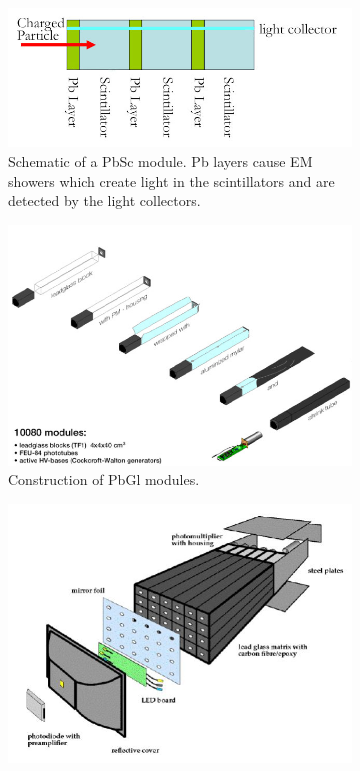 \begin{figure}
\centering
\begin{subfigure}[p]{0.5\textwidth}
    \centering
    \includegraphics[width=\textwidth]{Figures/PbScschematic.jpg}\ssp
    \caption{Schematic of a PbSc module. Pb layers cause EM showers which create light in the scintillators and are detected by the light collectors.}
    \label{fig:pbscmodule}
\end{subfigure}
\begin{subfigure}[b]{0.6\textwidth}
    \centering
    \includegraphics[width=\textwidth]{Figures/PbGlmodules.jpg}
    \caption{Construction of PbGl modules.}
    \label{fig:ppiratiocentvsperiph}
\end{subfigure}
\begin{subfigure}[b]{0.6\textwidth}
    \centering
    \includegraphics[width=\textwidth]{Figures/pbglsupermodule.JPG}

\end{subfigure}
\end{figure}
